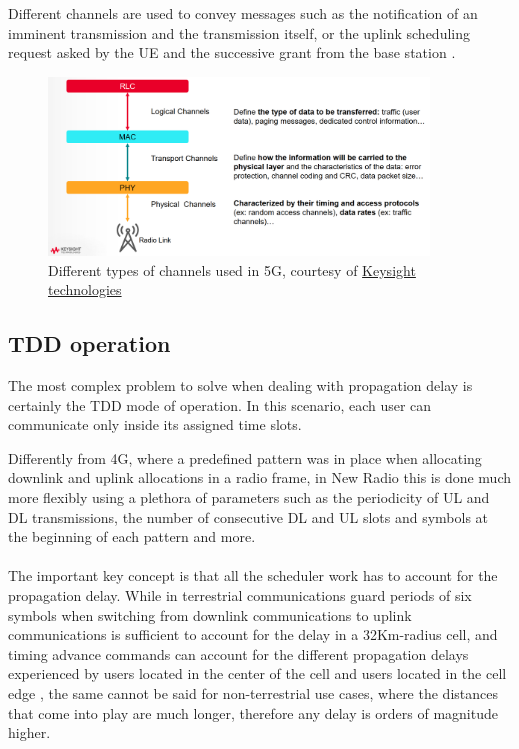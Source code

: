 Different channels are used to convey messages such as the notification of an imminent transmission and the transmission itself, or the uplink scheduling request asked by the \ac{UE} and the successive grant from the base station \cite{5g-mac-devopedia}.

\begin{figure}[ht]
    \centering
    \includegraphics[width=0.9\textwidth]{res/nr-types-channels.png}
    \caption{Different types of channels used in 5G, courtesy of \href{https://www.keysight.com/}{ Keysight technologies}}
    \label{fig:nr-types-channels}
\end{figure}

\subsection{TDD operation}
The most complex problem to solve when dealing with propagation delay is certainly the \ac{TDD} mode of operation. In this scenario, each user can communicate only inside its assigned time slots.

Differently from 4G, where a predefined pattern was in place when allocating downlink and uplink allocations in a radio frame, in New Radio this is done much more flexibly using a plethora of parameters such as the periodicity of UL and DL transmissions, the number of consecutive DL and UL slots and symbols at the beginning of each pattern and more.

\paragraph{}The important key concept is that all the scheduler work has to account for the propagation delay. While in terrestrial communications guard periods of six symbols when switching from downlink communications to uplink communications is sufficient to account for the delay in a 32Km-radius cell, and timing advance commands can account for the different propagation delays experienced by users located in the center of the cell and users located in the cell edge \cite{gsma-5g-tdd-sync}, the same cannot be said for non-terrestrial use cases, where the distances that come into play are much longer, therefore any delay is orders of magnitude higher.

